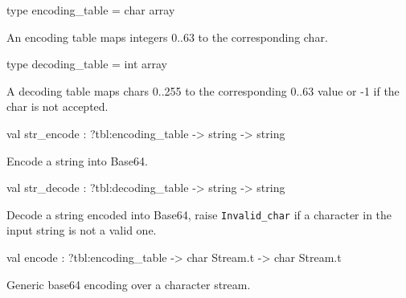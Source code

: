 \documentclass[11pt]{article}
\begin{document}
\label{type:XmlRpcBase64.encoding-underscoretable}\begin{ocamldoccode}
type encoding_table = char array 
\end{ocamldoccode}
\begin{ocamldocdescription}
An encoding table maps integers 0..63 to the corresponding char.


\end{ocamldocdescription}




\label{type:XmlRpcBase64.decoding-underscoretable}\begin{ocamldoccode}
type decoding_table = int array 
\end{ocamldoccode}
\begin{ocamldocdescription}
A decoding table maps chars 0..255 to the corresponding 0..63 value
 or -1 if the char is not accepted.


\end{ocamldocdescription}




\label{val:XmlRpcBase64.str-underscoreencode}\begin{ocamldoccode}
val str_encode : ?tbl:encoding_table -> string -> string
\end{ocamldoccode}
\begin{ocamldocdescription}
Encode a string into Base64.


\end{ocamldocdescription}




\label{val:XmlRpcBase64.str-underscoredecode}\begin{ocamldoccode}
val str_decode : ?tbl:decoding_table -> string -> string
\end{ocamldoccode}
\begin{ocamldocdescription}
Decode a string encoded into Base64, raise {\tt{Invalid\_char}} if a
	character in the input string is not a valid one.


\end{ocamldocdescription}




\label{val:XmlRpcBase64.encode}\begin{ocamldoccode}
val encode : ?tbl:encoding_table -> char Stream.t -> char Stream.t
\end{ocamldoccode}
\begin{ocamldocdescription}
Generic base64 encoding over a character stream.


\end{ocamldocdescription}
\end{document}

